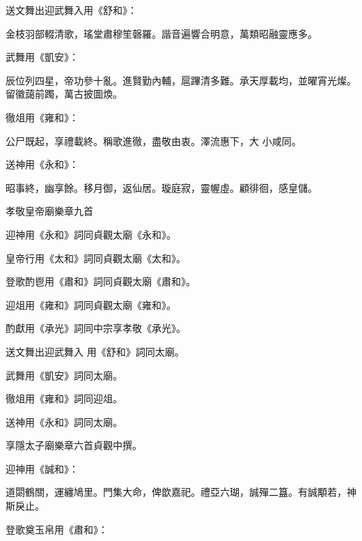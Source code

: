\begin{pinyinscope}
 送文舞出迎武舞入用《舒和》：



 金枝羽部輟清歌，瑤堂肅穆笙磬羅。諧音遍響合明意，萬類昭融靈應多。



 武舞用《凱安》：



 辰位列四星，帝功參十亂。進賢勤內輔，扈蹕清多難。承天厚載均，並曜宵光燦。留徽藹前躅，萬古披圖煥。



 徹俎用《雍和》：



 公尸既起，享禮載終。稱歌進徹，盡敬由衷。澤流惠下，大
 小咸同。



 送神用《永和》：



 昭事終，幽享餘。移月御，返仙居。璇庭寂，靈幄虛。顧徘徊，感皇儲。



 孝敬皇帝廟樂章九首



 迎神用《永和》詞同貞觀太廟《永和》。



 皇帝行用《太和》詞同貞觀太廟《太和》。



 登歌酌鬯用《肅和》詞同貞觀太廟《肅和》。



 迎俎用《雍和》詞同貞觀太廟《雍和》。



 酌獻用《承光》詞同中宗享孝敬《承光》。



 送文舞出迎武舞入
 用《舒和》詞同太廟。



 武舞用《凱安》詞同太廟。



 徹俎用《雍和》詞同迎俎。



 送神用《永和》詞同太廟。



 享隱太子廟樂章六首貞觀中撰。



 迎神用《誠和》：



 道閟鶴關，運纏鳩里。門集大命，俾歆嘉祀。禮亞六瑚，誠殫二簋。有誠顒若，神斯戾止。



 登歌奠玉帛用《肅和》：




\end{pinyinscope}
